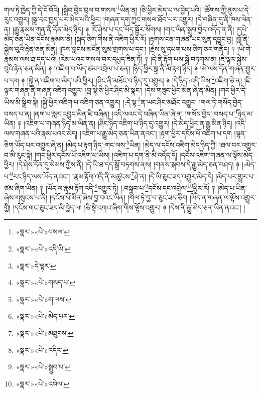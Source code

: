 གལ་ཏེ་ཁྱེད་ཀྱི་དེ་ངོ་བོའི། །སྒྲིབ་བྱེད་བྲལ་བ་གསལ་\footnote{«སྣར་»«པེ་»བསལ་}ཡིན་ན། །ཅི་ཕྱིར་མེད་པ་ལ་བྱེད་པའི། །ཚོགས་ཀྱི་ནུས་པ་དེ་རུང་འགྱུར། །སྒྲ་དང་ཁྱད་པར་མེད་པའི་ཕྱིར། །གཞན་དག་ཀྱང་གསལ་ཐོབ་པར་འགྱུར། །དེ་བཞིན་དུ་ནི་ཁས་ལེན་ན། །རྒྱུ་རྣམས་ཀུན་ནི་དོན་མེད་ཉིད། ༈ །ངོ་ཤེས་པ་དང་ཡོད་སྦྱོར་སོགས། །གང་ཡིན་སྒྲུབ་བྱེད་འདོད་ན་ནི། །དཔེ་མེད་ཅན་ཡིན་དངོས་རྣམས་ནི། །སྐད་ཅིག་གིས་ནི་འཇིག་ཕྱིར་རོ། །རྟགས་ངན་གཞན་ཡང་སུན་དབྱུང་བྱ། །བློ་ནི་སྐྱེས་བུའི་རྟེན་ཅན་མིན། །ཁས་བླངས་མངོན་སུམ་གྲགས་པ་དང་། །རྗེས་སུ་དཔག་པས་ཅིག་ཅར་གནོད། ༈ །ཡི་གེ་རྣམས་ལས་ཐ་དད་པའི། །རིམ་པའང་གསལ་བར་དཔྱད་ཟིན་ཏོ། ༈ །དེ་ནི་རྟོག་པས་སྒྲོ་བཏགས་ན། །ཇི་ལྟར་སྐྱེས་བུའི་རྟེན་ཅན་མིན། ༈ །འཇིག་པ་ཡོད་ཙམ་འབྲེལ་པ་ཅན། །ཉིད་ཕྱིར་སྒྲ་ནི་མི་རྟག་ཉིད། ༈ །མེ་ལས་དོན་གཞན་གྱུར་པ་དག ༈ །སྐྱེ་ན་འཇིག་པ་མེད་པའི་ཕྱིར། །ཤིང་ནི་མཐོང་བ་ཉིད་དུ་འགྱུར། ༈ །དེ་ཉིད་:འདི་ཡིས་\footnote{«སྣར་»«པེ་»འདི་ཡི་}འཇིག་ཅེ་ན། །ཇི་ལྟར་གཞན་ནི་གཞན་འཇིག་འགྱུར། །བླ་སྟེ་ཅི་ཕྱིར་ཤིང་མི་སྣང་། །དེས་གཟུང་ཕྱིར་མིན་ཞེ་ན་མིན། །གང་ཕྱིར་དེ་ཡིས་མི་སྒྲིབ་སྟེ། །སྐྱེ་ཕྱིར་འཇིག་པ་འཇིག་ཅན་འགྱུར། །:དེ་ལྟ་\footnote{«སྣར་»དེ་ལྟར་}ན་ཡང་ཤིང་མཐོང་འགྱུར། །གལ་ཏེ་གསོད་བྱེད་བསད་པ་ན། །ནག་པ་སླར་འབྱུང་མིན་ཇི་བཞིན། །འདི་ལའང་དེ་བཞིན་ཡིན་ཞེ་ན། །གསོད་བྱེད་:བསད་པ་\footnote{«སྣར་»«པེ་»གསད་པ་}ཉིད་མ་ཡིན། ༈ །འཇིག་པ་གཞན་ཉིད་མ་ཡིན་ན། །ཤིང་ཉིད་འཇིག་པ་ཉིད་དུ་འགྱུར། །དེ་མེད་ཕྱིར་ན་རྒྱུ་མིན་ཉིད། །འདི་ལས་གཞན་པའི་རྣམ་པའང་མེད། །འཇིག་པ་རྒྱུ་མེད་ཅན་ཡིན་ནའང་། །རྟག་ཕྱིར་དངོས་པོ་འཇིག་པ་དག །ལྷན་ཅིག་ཡོད་པར་འགྱུར་ཞེ་ན། །མེད་པ་རྟག་ཉིད་:གང་ལས་\footnote{«སྣར་»«པེ་»ག་ལས་}ཡིན། །མེད་ལ་དངོས་འཇིག་མེད་ཉིད་ཀྱི། །ཐལ་བར་འགྱུར་བ་མི་རུང་སྟེ། །གང་ཕྱིར་དངོས་པོ་འཇིག་པ་ཡིས། །འཇིག་པ་དག་ནི་མི་འདོད་དོ། །དངོས་འཇིག་གཞན་ལ་ལྟོས་མེད་ཕྱིར། །དེ་ཤེས་དོན་དུ་སེམས་ཀྱིས་ནི། །དེ་ཡི་ཐ་དད་སྒྲོ་བཏགས་ནས། །གནས་སྐབས་དེ་རྒྱུ་མེད་ཅན་བཤད། ༈ །:མེད་པ་\footnote{«སྣར་»«པེ་»མེད་པར་}རང་ཉིད་ལས་ཡོད་ནའང་། །རྣམ་རྟོག་འདི་ནི་མཚུངས་\footnote{«སྣར་»«པེ་»མཐུངས་}ཤེ་ན། །དེ་ཡི་ཅུང་ཟད་འགྱུར་མེད་དེ། །མེད་པར་གྱུར་པ་ཙམ་ཞིག་ཡིན། ༈ །ཡོད་ལ་རྣམ་རྟོག་འདི་\footnote{«སྣར་»«པེ་»འདིར་}འགྱུར་ཏེ། །:བསྒྲུབ་པ་\footnote{«སྣར་»«པེ་»སྒྲུབ་པ་}དངོས་དང་འབྲེལ་\footnote{«སྣར་»«པེ་»འབེལ་}ཕྱིར་རོ། ༈ །མེད་པ་ཡིན་ཞེས་གསུངས་པ་ནི། །དངོས་པོ་མིན་ཞེས་བྱ་བའང་ཡིན། །གལ་ཏེ་བྱ་བ་ཅུང་ཟད་ཅིག །ཡོད་ན་གཞན་ལ་ལྟོས་འགྱུར་གྱི། །དངོས་གང་ཅུང་ཟད་མི་བྱེད་ལ། །ཅི་སྟེ་འགའ་ཞིག་གིས་ལྟོས་འགྱུར། ༈ །དེས་ནི་རྒྱུ་མེད་ཅན་ཡིན་ནའང་། །
